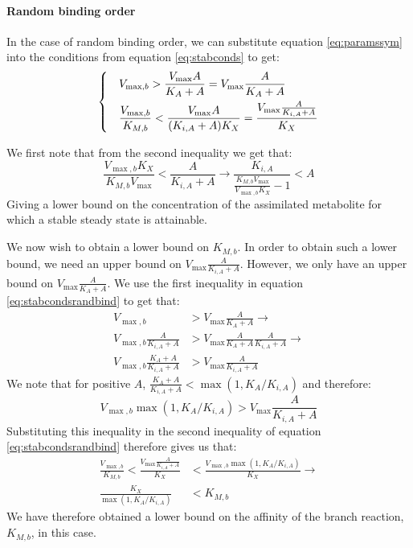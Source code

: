  \paragraph{Random binding order}
  In the case of random binding order, we can substitute equation \ref{eq:paramssym} into the conditions from equation \ref{eq:stabconds} to get:
  \begin{equation}
    \label{eq:stabcondsrandbind}
    \begin{dcases}
      & V_{\max,b}>\frac{V_{\max}A}{K_A+A}=V_{\max}\frac{A}{K_A+A} \\
      & \frac{V_{\max,b}}{K_{M,b}}<\frac{V_{\max}A}{(K_{i,A}+A)K_X}=\frac{V_{\max}\frac{A}{K_{i,A}+A}}{K_X}
    \end{dcases}
  \end{equation}

  We first note that from the second inequality we get that:
  \begin{equation}
    \label{eq:assimlowerbound}
      \frac{V_{\max,b}K_X}{K_{M,b}V_{\max}}<\frac{A}{K_{i,A}+A} \rightarrow
      \frac{K_{i,A}}{\frac{K_{M,b}V_{\max}}{V_{\max,b}K_X}-1}<A
  \end{equation}
  Giving a lower bound on the concentration of the assimilated metabolite for which a stable steady state is attainable.

  We now wish to obtain a lower bound on $K_{M,b}$.
  In order to obtain such a lower bound, we need an upper bound on $V_{\max}\frac{A}{K_{i,A}+A}$.
  However, we only have an upper bound on $V_{\max}\frac{A}{K_A+A}$.
  We use the first inequality in equation \ref{eq:stabcondsrandbind} to get that:
  \begin{equation*}
      \begin{split}
      V_{\max,b}&>V_{\max}\frac{A}{K_A+A} \rightarrow \\
      V_{\max,b}\frac{A}{K_{i,A}+A}&>V_{\max}\frac{A}{K_A+A}\frac{A}{K_{i,A}+A} \rightarrow \\
      V_{\max,b}\frac{K_A+A}{K_{i,A}+A}&>V_{\max}\frac{A}{K_{i,A}+A}
      \end{split}
  \end{equation*}
  We note that for positive $A$, $\frac{K_A+A}{K_{i,A}+A} < \max(1,K_A/K_{i,A})$ and therefore:
  \begin{equation*}
      V_{\max,b}\max(1,K_A/K_{i,A})>V_{\max}\frac{A}{K_{i,A}+A}
  \end{equation*}
  Substituting this inequality in the second inequality of equation \ref{eq:stabcondsrandbind} therefore gives us that:
  \begin{equation}
    \label{eq:randkbbound}
    \begin{split}
      \frac{V_{\max,b}}{K_{M,b}}<\frac{V_{\max}\frac{A}{K_{i,A}+A}}{K_X}&<\frac{V_{\max,b}\max(1,K_A/K_{i,A})}{K_X} \rightarrow\\
      \frac{K_X}{\max(1,K_A/K_{i,A})}&<K_{M,b}
    \end{split}
  \end{equation}
  We have therefore obtained a lower bound on the affinity of the branch reaction, $K_{M,b}$, in this case.

